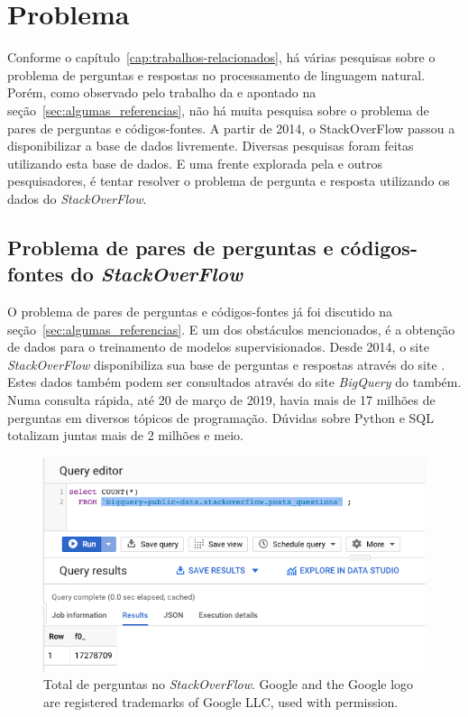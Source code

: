 \chapter{Problema}
\label{cap:problema}

Conforme o capítulo~\ref{cap:trabalhos-relacionados}, há várias pesquisas sobre o problema de perguntas e respostas no processamento de linguagem natural. Porém, como observado pelo trabalho da \cite{yao-2018} e apontado na seção~\ref{sec:algumas_referencias}, não há muita pesquisa sobre o problema de pares de perguntas e códigos-fontes. A partir de 2014, o StackOverFlow passou a disponibilizar a base de dados livremente. Diversas pesquisas foram feitas utilizando esta base de dados. E uma frente explorada pela \cite{yao-2018} e outros pesquisadores, é tentar resolver o problema de pergunta e resposta utilizando os dados do \textit{StackOverFlow}.

\section{Problema de pares de perguntas e códigos-fontes do \textit{StackOverFlow}}

O problema de pares de perguntas e códigos-fontes já foi discutido na seção~\ref{sec:algumas_referencias}. E um dos obstáculos mencionados, é a obtenção de dados para o treinamento de modelos supervisionados. Desde 2014, o site \textit{StackOverFlow} disponibiliza sua base de perguntas e respostas através do site \cite{sof-2019}. Estes dados também podem ser consultados através do site \textit{BigQuery} do \cite{bigquery-2019} também. Numa consulta rápida, até 20 de março de 2019, havia mais de 17 milhões de perguntas em diversos tópicos de programação. Dúvidas sobre Python e SQL totalizam juntas mais de 2 milhões e meio.

\begin{figure}[h]
\includegraphics[width=12cm]{src/figuras/cap-problema/post-questions-total.png}
\caption{Total de perguntas no \textit{StackOverFlow}. Google and the Google logo are registered trademarks of Google LLC, used with permission.}
\label{fig:bigquery-total-questions-stackoverflow}
\end{figure}

